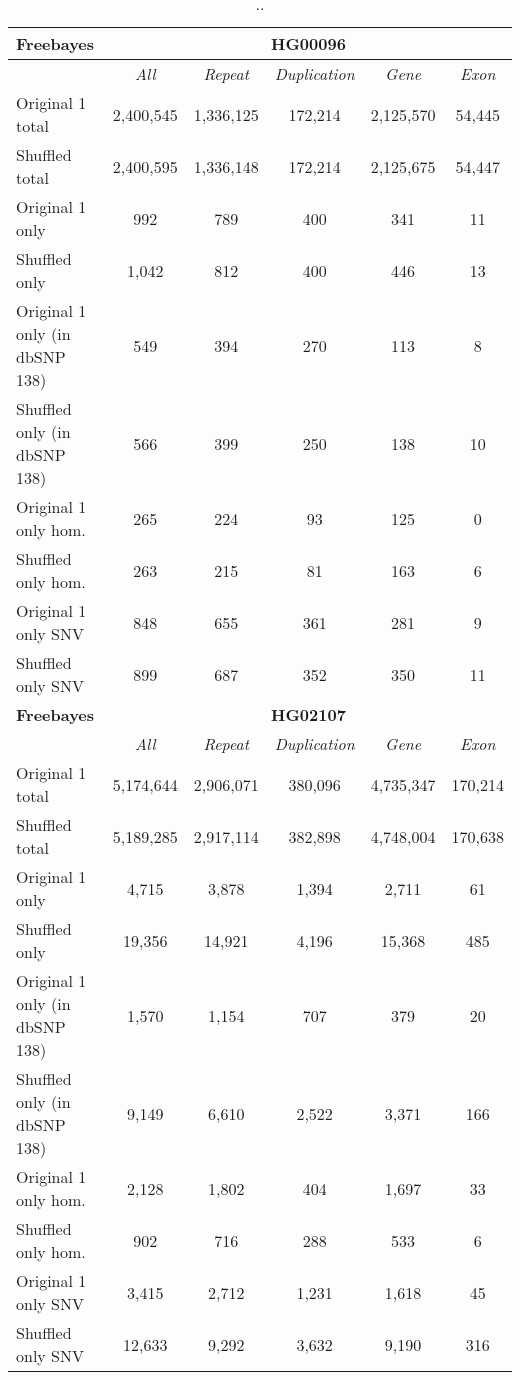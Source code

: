 \begin{table}[htb]
\caption{ .. }
\begin{center}
\begin{tabular}{|l|c||c|c|c|c|}
\hline
{\bf Freebayes} & \multicolumn{5}{|c|}{\bf HG00096} \\
\hline
\cline{2-6}
{\bf} & {\it All} & {\it Repeat} & {\it Duplication} & {\it Gene} & {\it Exon} \\
\hline
Original 1 total & 2,400,545 & 1,336,125 & 172,214 & 2,125,570 & 54,445 \\
\hline
Shuffled total & 2,400,595 & 1,336,148 & 172,214 & 2,125,675 & 54,447 \\
\hline
Original 1 only & 992 & 789 & 400 & 341 & 11 \\
\hline
Shuffled only & 1,042 & 812 & 400 & 446 & 13 \\
\hline
Original 1 only (in dbSNP 138) & 549 & 394 & 270 & 113 & 8 \\
\hline
Shuffled only (in dbSNP 138) & 566 & 399 & 250 & 138 & 10 \\
\hline
Original 1 only hom. & 265 & 224 & 93 & 125 & 0 \\
\hline
Shuffled only hom. & 263 & 215 & 81 & 163 & 6 \\
\hline
Original 1 only SNV & 848 & 655 & 361 & 281 & 9 \\
\hline
Shuffled only SNV & 899 & 687 & 352 & 350 & 11 \\ 
\hline
\hline
{\bf Freebayes} & \multicolumn{5}{|c|}{\bf HG02107} \\
\hline
\cline{2-6}
{\bf} & {\it All} & {\it Repeat} & {\it Duplication} & {\it Gene} & {\it Exon} \\
\hline
Original 1 total & 5,174,644 & 2,906,071 & 380,096 & 4,735,347 & 170,214 \\
\hline
Shuffled total & 5,189,285 & 2,917,114 & 382,898 & 4,748,004 & 170,638 \\
\hline
Original 1 only & 4,715 & 3,878 & 1,394 & 2,711 & 61 \\
\hline
Shuffled only & 19,356 & 14,921 & 4,196 & 15,368 & 485 \\
\hline
Original 1 only (in dbSNP 138) & 1,570 & 1,154 & 707 & 379 & 20 \\
\hline
Shuffled only (in dbSNP 138) & 9,149 & 6,610 & 2,522 & 3,371 & 166 \\
\hline
Original 1 only hom. & 2,128 & 1,802 & 404 & 1,697 & 33 \\
\hline
Shuffled only hom. & 902 & 716 & 288 & 533 & 6 \\
\hline
Original 1 only SNV & 3,415 & 2,712 & 1,231 & 1,618 & 45 \\
\hline
Shuffled only SNV & 12,633 & 9,292 & 3,632 & 9,190 & 316 \\  
\hline
\end{tabular}
\end{center}
\label{tab:orig-vs-shuf-freebayes}
\end{table}


